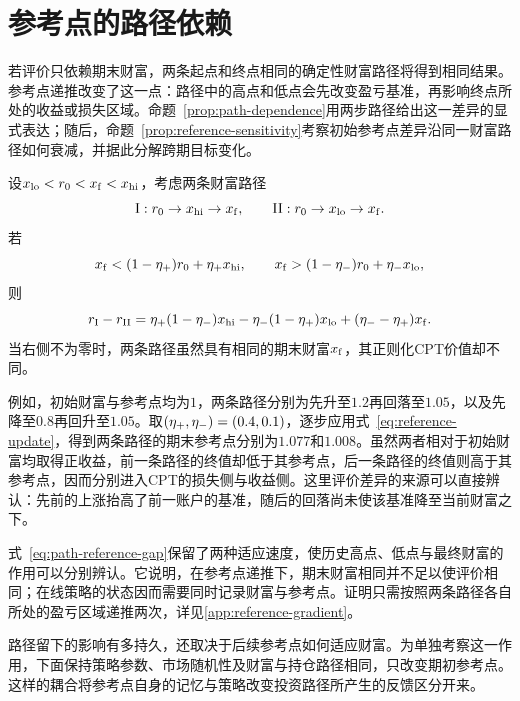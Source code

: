 \section{参考点的路径依赖}

若评价只依赖期末财富，两条起点和终点相同的确定性财富路径将得到相同结果。参考点递推改变了这一点：路径中的高点和低点会先改变盈亏基准，再影响终点所处的收益或损失区域。命题~\ref{prop:path-dependence}用两步路径给出这一差异的显式表达；随后，命题~\ref{prop:reference-sensitivity}考察初始参考点差异沿同一财富路径如何衰减，并据此分解跨期目标变化。

\begin{proposition}[相同期末财富与不同的CPT价值]\label{prop:path-dependence}
设$x_{\rm lo}<r_0<x_{\rm f}<x_{\rm hi}$，考虑两条财富路径
\[
 \mathrm{I}: r_0\to x_{\rm hi}\to x_{\rm f},
 \qquad
 \mathrm{II}: r_0\to x_{\rm lo}\to x_{\rm f}.
\]
若
\[
 x_{\rm f}<(1-\eta_{+})r_0+\eta_{+} x_{\rm hi},
 \qquad
 x_{\rm f}>(1-\eta_{-})r_0+\eta_{-} x_{\rm lo},
\]
则
\begin{equation}\label{eq:path-reference-gap}
 r_{\rm I}-r_{\rm II}
 =\eta_{+}(1-\eta_{-})x_{\rm hi}
 -\eta_{-}(1-\eta_{+})x_{\rm lo}
 +(\eta_{-}-\eta_{+})x_{\rm f}.
\end{equation}
当右侧不为零时，两条路径虽然具有相同的期末财富$x_{\rm f}$，其正则化CPT价值却不同。
\end{proposition}

例如，初始财富与参考点均为$1$，两条路径分别为先升至$1.2$再回落至$1.05$，以及先降至$0.8$再回升至$1.05$。取$(\eta_{+},\eta_{-})=(0.4,0.1)$，逐步应用式~\eqref{eq:reference-update}，得到两条路径的期末参考点分别为$1.077$和$1.008$。虽然两者相对于初始财富均取得正收益，前一条路径的终值却低于其参考点，后一条路径的终值则高于其参考点，因而分别进入CPT的损失侧与收益侧。这里评价差异的来源可以直接辨认：先前的上涨抬高了前一账户的基准，随后的回落尚未使该基准降至当前财富之下。

式~\eqref{eq:path-reference-gap}保留了两种适应速度，使历史高点、低点与最终财富的作用可以分别辨认。它说明，在参考点递推下，期末财富相同并不足以使评价相同；在线策略的状态因而需要同时记录财富与参考点。证明只需按照两条路径各自所处的盈亏区域递推两次，详见\ref{app:reference-gradient}。

路径留下的影响有多持久，还取决于后续参考点如何适应财富。为单独考察这一作用，下面保持策略参数、市场随机性及财富与持仓路径相同，只改变期初参考点。这样的耦合将参考点自身的记忆与策略改变投资路径所产生的反馈区分开来。

